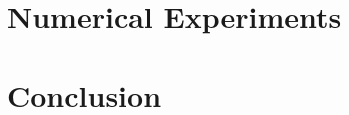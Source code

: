\documentclass{article}
\begin{document}
\section{Numerical Experiments}
\label{sec:experiments}




\section{Conclusion}
\label{sec:conclusion}




\vfill
\pagebreak




\end{document}
